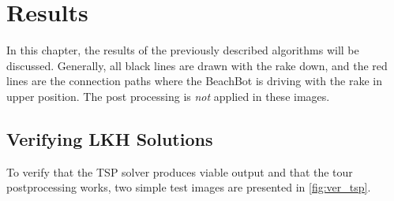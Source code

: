 \chapter{Results}

In this chapter, the results of the previously described algorithms will be discussed. Generally, all black lines are drawn with the rake down, and the red lines are the connection paths where the BeachBot is driving with the rake in upper position. The post processing is \textit{not} applied in these images.

\section{Verifying LKH Solutions}

To verify that the TSP solver produces viable output and that the tour postprocessing works, two simple test images are presented in \autoref{fig:ver_tsp}.

